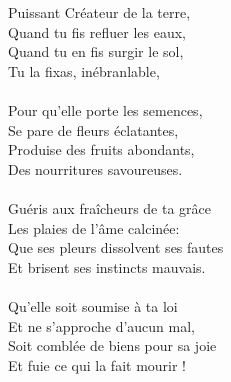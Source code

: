 Puissant Créateur de la terre,\\
Quand tu fis refluer les eaux,\\
Quand tu en fis surgir le sol,\\
Tu la fixas, inébranlable,\\
\\
Pour qu’elle porte les semences,\\
Se pare de fleurs éclatantes,\\
Produise des fruits abondants,\\
Des nourritures savoureuses.\\
\\
Guéris aux fraîcheurs de ta grâce\\
Les plaies de l’âme calcinée:\\
Que ses pleurs dissolvent ses fautes\\
Et brisent ses instincts mauvais.\\
\\
Qu’elle soit soumise à ta loi\\
Et ne s’approche d’aucun mal,\\
Soit comblée de biens pour sa joie\\
Et fuie ce qui la fait mourir !